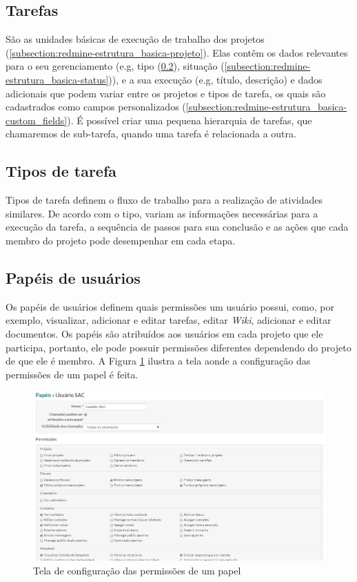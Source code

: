 \subsection{Tarefas}\label{subsection:redmine-estrutura_basica-tarefa}

São as unidades básicas de execução de trabalho dos projetos (\ref{subsection:redmine-estrutura_basica-projeto}). Elas contêm os dados relevantes para o seu gerenciamento (e.g, tipo (\ref{subsection:redmine-estrutura_basica-tracker}), situação (\ref{subsection:redmine-estrutura_basica-status})), e a sua execução (e.g, título, descrição) e dados adicionais que podem variar entre os projetos e tipos de tarefa, os quais são cadastrados como campos personalizados (\ref{subsection:redmine-estrutura_basica-custom_fields}). É possível criar uma pequena hierarquia de tarefas, que chamaremos de sub-tarefa, quando uma tarefa é relacionada a outra.

\subsection{Tipos de tarefa}\label{subsection:redmine-estrutura_basica-tracker}

Tipos de tarefa definem o fluxo de trabalho para a realização de atividades similares. De acordo com o tipo, variam as informações necessárias para a execução da tarefa, a sequência de passos para sua conclusão e as ações que cada membro do projeto pode desempenhar em cada etapa.

\subsection{Papéis de usuários}\label{subsection:redmine-estrutura_basica-role}

Os papéis de usuários definem quais permissões um usuário possui, como, por exemplo, visualizar, adicionar e editar tarefas, editar \textit{Wiki}, adicionar e editar documentos. Os papéis são atribuídos aos usuários em cada projeto que ele participa, portanto, ele pode possuir permissões diferentes dependendo do projeto de que ele é membro. A Figura \ref{fig:redmine_papeis} ilustra a tela aonde a configuração das permissões de um papel é feita.

\begin{figure}[H]
  \centering
  \includegraphics[width=1.0\textwidth]{imagens/redmine_papeis.png}
  \caption{Tela de configuração das permissões de um papel}
  \label{fig:redmine_papeis}
\end{figure}

